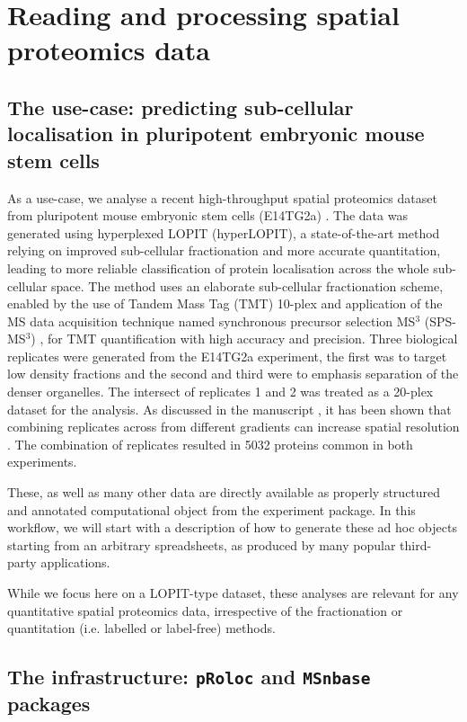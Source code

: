 \section*{Reading and processing spatial proteomics data}

\subsection*{The use-case: predicting sub-cellular localisation in pluripotent embryonic mouse stem cells}

As a use-case, we analyse a recent high-throughput spatial proteomics
dataset from pluripotent mouse embryonic stem cells (E14TG2a)
\cite{hyper}. The data was generated using hyperplexed LOPIT
(hyperLOPIT), a state-of-the-art method relying on improved
sub-cellular fractionation and more accurate quantitation, leading to
more reliable classification of protein localisation across the whole
sub-cellular space. The method uses an elaborate sub-cellular
fractionation scheme, enabled by the use of Tandem Mass Tag (TMT)
\cite{Thompson:2003} 10-plex and application of the MS data
acquisition technique named synchronous precursor selection MS$^3$
(SPS-MS$^3$) \cite{McAlister:2014}, for TMT quantification with high
accuracy and precision. Three biological replicates were generated
from the E14TG2a experiment, the first was to target low density
fractions and the second and third were to emphasis separation of the
denser organelles.  The intersect of replicates 1 and 2 was treated as
a 20-plex dataset for the analysis.  As discussed in the manuscript
\cite{hyper}, it has been shown that combining replicates across from
different gradients can increase spatial resolution
\cite{Trotter:2010}. The combination of replicates resulted in 5032
proteins common in both experiments.

These, as well as many other data are directly available as properly
structured and annotated computational object from the 
 experiment package. In this workflow, we
will start with a description of how to generate these ad hoc objects
starting from an arbitrary spreadsheets, as produced by many popular
third-party applications. 

While we focus here on a LOPIT-type dataset, these analyses are
relevant for any quantitative spatial proteomics data, irrespective of
the fractionation or quantitation (i.e. labelled or label-free)
methods.

\subsection*{The infrastructure: \texttt{pRoloc} and \texttt{MSnbase} packages}

